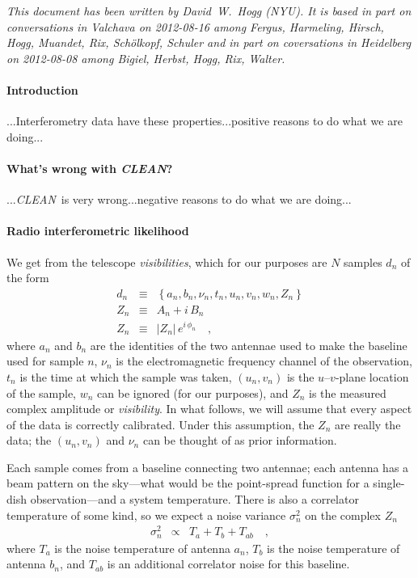 \documentclass[12pt]{article}
\newcommand{\project}[1]{\textsl{#1}}
\newcommand{\CLEAN}{\project{CLEAN}}
\renewcommand{\exp}[1]{e^{#1}}
\newcommand{\set}[1]{\left\{{#1}\right\}}
\begin{document}
\textsl{This document has been written by David~W.~Hogg (NYU).  It is
  based in part on conversations in Valchava on 2012-08-16 among
  Fergus, Harmeling, Hirsch, Hogg, Muandet, Rix, Sch\"olkopf, Schuler
  and in part on coversations in Heidelberg on 2012-08-08 among
  Bigiel, Herbst, Hogg, Rix, Walter.}

\paragraph{Introduction}

...Interferometry data have these properties...positive reasons to do
what we are doing...

\paragraph{What's wrong with \CLEAN?}

...\CLEAN\ is very wrong...negative reasons to do what we are doing...

\paragraph{Radio interferometric likelihood}

We get from the telescope \emph{visibilities}, which for our purposes
are $N$ samples $d_n$ of the form
\begin{eqnarray}
d_n &\equiv& \set{a_n, b_n, \nu_n, t_n, u_n, v_n, w_n, Z_n}
\\
Z_n &\equiv& A_n + i\,B_n
\\
Z_n &\equiv& \left|Z_n\right|\,\exp{i\,\phi_n}
\quad,
\end{eqnarray}
where $a_n$ and $b_n$ are the identities of the two antennae used to
make the baseline used for sample $n$, $\nu_n$ is the electromagnetic
frequency channel of the observation, $t_n$ is the time at which the
sample was taken, $(u_n, v_n)$ is the $u$--$v$-plane location of the
sample, $w_n$ can be ignored (for our purposes), and $Z_n$ is the
measured complex amplitude or \emph{visibility}.  In what follows, we
will assume that every aspect of the data is correctly calibrated.
Under this assumption, the $Z_n$ are really the data; the $(u_n,
v_n)$ and $\nu_n$ can be thought of as prior information.

Each sample comes from a baseline connecting two antennae; each
antenna has a beam pattern on the sky---what would be the point-spread
function for a single-dish observation---and a system temperature.
There is also a correlator temperature of some kind, so we expect a
noise variance $\sigma_n^2$ on the complex $Z_n$
\begin{eqnarray}
\sigma_n^2 &\propto& T_a + T_b + T_{ab}
\quad ,
\end{eqnarray}
where $T_a$ is the noise temperature of antenna $a_n$, $T_b$ is the
noise temperature of antenna $b_n$, and $T_{ab}$ is an additional
correlator noise for this baseline.
\end{document}
